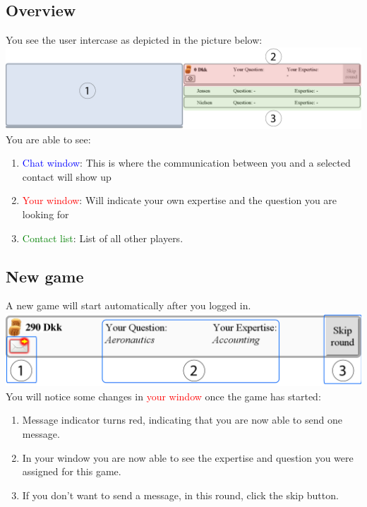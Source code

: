 \documentclass[a4paper,10pt]{article}
\begin{document}

 \subsection{Overview}
You see the user intercase as depicted in the picture below:\\
\includegraphics[width=\textwidth]{overview.pdf}\\
You are able to see:
 \begin{enumerate}
 \item \textcolor{blue}{Chat window}:  This is where the communication between you and a selected contact will show up
 \item \textcolor{red}{Your window}: Will indicate your own expertise and the question you are looking for
 \item \textcolor{green}{Contact list}: List of all other players.
 \end{enumerate}
 
 \subsection{New game}
 A new game will start automatically after you logged in.\\
\includegraphics[width=\textwidth]{newGameUserWindow.pdf}\\

 You will notice some changes in \textcolor{red}{your window} once the game has started: 
  \begin{enumerate}
  \item Message indicator turns red, indicating that you are now able to send one message.
  \item In your window you are now able to see the expertise and question you were assigned for this game. 
   \item  If you don't want to send a message, in this round, click the skip button.
  \end{enumerate}
\end{document}
